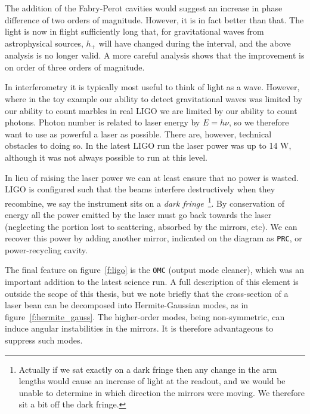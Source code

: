 The addition of the Fabry-Perot cavities would suggest an increase in
phase difference of two orders of magnitude.  However, it is in fact
better than that.  The light is now in flight sufficiently long that,
for gravitational waves from astrophysical sources, $h_+$ will have
changed during the interval, and the above analysis is no longer
valid.  A more careful analysis shows that the improvement is on order
of three orders of magnitude.

In interferometry it is typically most useful to think of light as a
wave.  However, where in the toy example our ability to detect
gravitational waves was limited by our ability to count marbles in
real LIGO we are limited by our ability to count photons.  Photon
number is related to laser energy by $E=h\nu$, so we therefore want to
use as powerful a laser as possible.  There are, however, technical
obstacles to doing so.  In the latest LIGO run the laser power was up
to 14 W, although it was not always possible to run at this level.

In lieu of raising the laser power we can at least ensure that no
power is wasted.  LIGO is configured such that the beams interfere
destructively when they recombine, we say the instrument sits on a
\emph{dark fringe}~\footnote{Actually if we sat exactly on a dark
fringe then any change in the arm lengths would cause an increase of
light at the readout, and we would be unable to determine in which
direction the mirrors were moving.  We therefore sit a bit off the
dark fringe.}.  By conservation of energy all the power emitted by the
laser must go back towards the laser (neglecting the portion lost to
scattering, absorbed by the mirrors, etc).  We can recover this power
by adding another mirror, indicated on the diagram as \texttt{PRC}, or
power-recycling cavity.

The final feature on figure~\ref{f:ligo} is the \texttt{OMC} (output
mode cleaner), which was an important addition to the latest science
run.  A full description of this element is outside the scope of this
thesis, but we note briefly that the cross-section of a laser bean can
be decomposed into Hermite-Gaussian modes, as in
figure~\ref{f:hermite_gauss}.  The higher-order modes, being
non-symmetric, can induce angular instabilities in the mirrors.  It is
therefore advantageous to suppress such modes.

